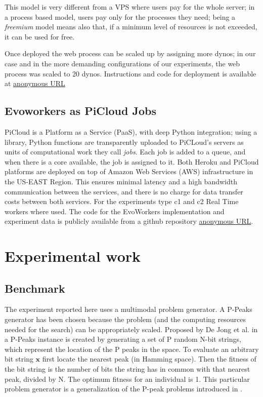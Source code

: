 \documentclass{sig-alternate}
\begin{document}
This model is very different from a VPS where users pay for the
whole server; in a process based model, users pay only for the
processes they need; being a {\em freemium} model means also that, if
a minimum level of resources is not exceeded, it can be used for
free. 

Once deployed the web process can be scaled up by assigning more dynos;
in our case and in the more demanding configurations of our experiments, 
the web process was scaled to 20 dynos. Instructions and code for deployment 
is available at \url{anonymous URL} %



\subsection{Evoworkers as PiCloud Jobs}
PiCloud is a Platform as a Service (PaaS), with deep Python integration; 
using a library, Python functions are transparently uploaded to PiCLoud's 
servers as units of computational work they call \emph{jobs}. 
Each job is added to a queue, and when there is a core available, 
the job is assigned to it. Both Heroku and PiCloud 
platforms are deployed  on top of Amazon Web Services (AWS) 
infrastructure in the US-EAST Region. This ensures minimal 
latency and a high bandwidth communication between the services, 
and there is no charge for data transfer costs between both services.
For the experiments type c1 and c2 Real Time workers where used.  
The code for the EvoWorkers implementation and experiment data is publicly available 
from a github repository \url{anonymous URL}. 

\section{Experimental work}
\label{sec:experiments}
\subsection{Benchmark}
\label{ss:benchmark}
The experiment reported here uses a multimodal problem generator. A P-Peaks generator
has been chosen because the problem (and the computing resources needed for the search) 
can be appropriately scaled. Proposed by De Jong et al. in \cite{Jong:PS97} a
P-Peaks instance is created by generating a set of P random N-bit
strings, which represent the location of the P peaks in the space. To
evaluate an arbitrary bit string \begin{math} \mathbf{x} \end{math}
first locate the nearest peak (in Hamming space). Then the fitness of
the bit string is the number of bits the string has in common with
that nearest peak, divided by N. The optimum fitness for an individual
is 1. This particular problem generator is a generalization of the
P-peak problems introduced in \cite{Jong:1990}.            
\end{document}
